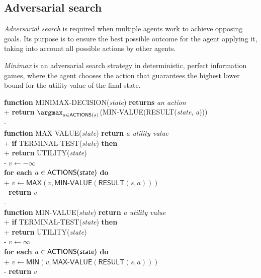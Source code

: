 \documentclass{article}
\begin{document}
\subsection{Adversarial search}


\begin{definition}[R\&N p. 161]
	\emph{Adversarial search} is required when multiple agents work to achieve
	opposing goals. Its purpose is to ensure the best possible outcome for the
	agent applying it, taking into account all possible actions by other agents.
\end{definition}

\begin{definition}[R\&N p. 165]
	\emph{Minimax} is an adversarial search strategy in deterministic, perfect
	information games, where the agent chooses the action that guarantees the
	highest lower bound for the utility value of the final state.

	\begin{pseudo}
		\textbf{function} MINIMAX-DECISION(\emph{state}) \textbf{returns} \emph{an action}\\+
		\textbf{return} $\argmax_{a\in\textsf{ACTIONS}(s)}$(MIN-VALUE(RESULT(\emph{state}, \emph{a})))\\-
		\\
		\textbf{function} MAX-VALUE(\emph{state}) \textbf{return} \emph{a utility value}\\+
		\textbf{if} TERMINAL-TEST(\emph{state}) \textbf{then}\\+
		\textbf{return} UTILITY(\emph{state})\\-
		$v\leftarrow-\infty$\\
		\textbf{for each} $a\in\textsf{ACTIONS(\emph{state})}$ \textbf{do}\\+
		$v\leftarrow \textsf{MAX}(v, \textsf{MIN-VALUE}(\textsf{RESULT}(s, a)))$\\-
		\textbf{return} $v$\\-
		\\
		\textbf{function} MIN-VALUE(\emph{state}) \textbf{return} \emph{a utility value}\\+
		\textbf{if} TERMINAL-TEST(\emph{state}) \textbf{then}\\+
		\textbf{return} UTILITY(\emph{state})\\-
		$v\leftarrow\infty$\\
		\textbf{for each} $a\in\textsf{ACTIONS(\emph{state})}$ \textbf{do}\\+
		$v\leftarrow \textsf{MIN}(v, \textsf{MAX-VALUE}(\textsf{RESULT}(s, a)))$\\-
		\textbf{return} $v$
	\end{pseudo}
\end{definition}
\end{document}

